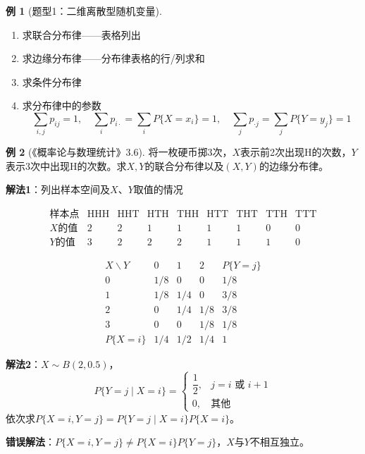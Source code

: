 \documentclass[11pt,a4paper]{report}
\theoremstyle{definition}
\newtheorem{example}{例}[chapter]
\theoremstyle{plain}
\begin{document}
\begin{example}[题型1：二维离散型随机变量]
\begin{enumerate}[label=\arabic*.,leftmargin=2em]
    \item 求联合分布律——表格列出
    \item 求边缘分布律——分布律表格的行/列求和
    \item 求条件分布律
    \item 求分布律中的参数
    \[
    \sum_{i,j}p_{ij}=1,\quad \sum_{i}p_{i\cdot}=\sum_{i}P\{X=x_i\}=1,\quad \sum_{j}p_{\cdot j}=\sum_{j}P\{Y=y_j\}=1
    \]
\end{enumerate}
\end{example}

\begin{example}[《概率论与数理统计》3.6]
将一枚硬币掷3次，\(X\)表示前2次出现H的次数，\(Y\)表示3次中出现H的次数。求\(X,Y\)的联合分布律以及\((X,Y)\)的边缘分布律。

\textbf{解法1}：列出样本空间及\(X\)、\(Y\)取值的情况

\[
\begin{array}{c|cccccccc}
\text{样本点} & \text{HHH} & \text{HHT} & \text{HTH} & \text{THH} & \text{HTT} & \text{THT} & \text{TTH} & \text{TTT} \\ \hline
X\text{的值} & 2 & 2 & 1 & 1 & 1 & 1 & 0 & 0 \\
Y\text{的值} & 3 & 2 & 2 & 2 & 1 & 1 & 1 & 0
\end{array}
\]

\[
\begin{array}{c|ccc|c}
X\backslash Y & 0 & 1 & 2 & P\{Y=j\} \\ \hline
0 & 1/8 & 0 & 0 & 1/8 \\
1 & 1/8 & 1/4 & 0 & 3/8 \\
2 & 0 & 1/4 & 1/8 & 3/8 \\
3 & 0 & 0 & 1/8 & 1/8 \\ \hline
P\{X=i\} & 1/4 & 1/2 & 1/4 & 1
\end{array}
\]

\textbf{解法2}：\(X\sim B(2,0.5)\)，
\[
P\{Y=j\mid X=i\}=\begin{cases}
\dfrac{1}{2}, & j=i\text{ 或 }i+1 \\[6pt]
0, & \text{其他}
\end{cases}
\]
依次求\(P\{X=i,Y=j\}=P\{Y=j\mid X=i\}P\{X=i\}\)。

\textbf{错误解法}：\(P\{X=i,Y=j\}\neq P\{X=i\}P\{Y=j\}\)，\(X\)与\(Y\)不相互独立。
\end{example}
\end{document}
